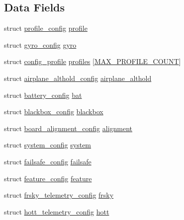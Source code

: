 \subsection*{Data Fields}
\begin{DoxyCompactItemize}
\item 
struct \hyperlink{structprofile__config}{profile\+\_\+config} \hyperlink{structconfig_abde2854d55ccbbf03e3e308adba984f9}{profile}
\item 
struct \hyperlink{structgyro__config}{gyro\+\_\+config} \hyperlink{structconfig_a0a9d3790f18b6caa8864884b85521da1}{gyro}
\item 
struct \hyperlink{structconfig__profile}{config\+\_\+profile} \hyperlink{structconfig_a4cea9f922bb1e0bea95d87c9b006dfff}{profiles} \mbox{[}\hyperlink{group__config_gacfd2f8c35eaccee63c54b7b6d528e8bc}{M\+A\+X\+\_\+\+P\+R\+O\+F\+I\+L\+E\+\_\+\+C\+O\+U\+N\+T}\mbox{]}
\item 
struct \hyperlink{structairplane__althold__config}{airplane\+\_\+althold\+\_\+config} \hyperlink{structconfig_a97e27d1fff52c6cb89e815dae9e4817a}{airplane\+\_\+althold}
\item 
struct \hyperlink{structbattery__config}{battery\+\_\+config} \hyperlink{structconfig_ab0e325a2604d16377941d81d648d818a}{bat}
\item 
struct \hyperlink{structblackbox__config}{blackbox\+\_\+config} \hyperlink{structconfig_aa1d63939b04ed1035f2209dff0b5c0cf}{blackbox}
\item 
struct \hyperlink{structboard__alignment__config}{board\+\_\+alignment\+\_\+config} \hyperlink{structconfig_a0b68de3c83b070e882796f13cbb9d9a7}{alignment}
\item 
struct \hyperlink{structsystem__config}{system\+\_\+config} \hyperlink{structconfig_af42bc80968b21cd9c440ea1b32bae7d4}{system}
\item 
struct \hyperlink{structfailsafe__config}{failsafe\+\_\+config} \hyperlink{structconfig_ab701fb6479e6aca9f3670653d28f6e5d}{failsafe}
\item 
struct \hyperlink{structfeature__config}{feature\+\_\+config} \hyperlink{structconfig_a90fec35d296ce999424add0fae6cb3cc}{feature}
\item 
struct \hyperlink{structfrsky__telemetry__config}{frsky\+\_\+telemetry\+\_\+config} \hyperlink{structconfig_a4635fa51252ac9c251be101e6c40da11}{frsky}
\item 
struct \hyperlink{structhott__telemetry__config}{hott\+\_\+telemetry\+\_\+config} \hyperlink{structconfig_ac2155b993a124aacbc1370bad1e20666}{hott}

\end{DoxyCompactItemize}
